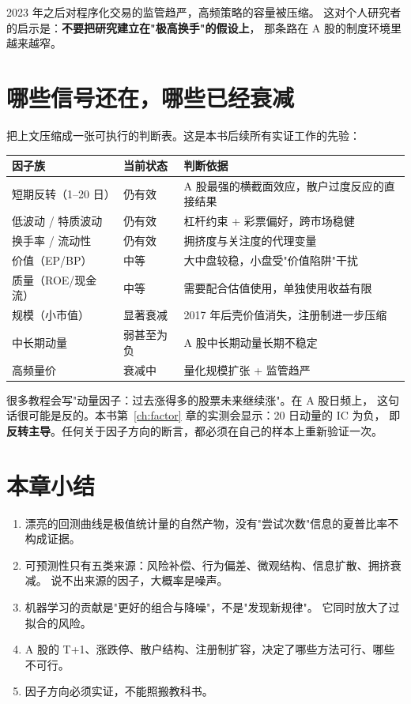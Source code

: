 2023 年之后对程序化交易的监管趋严，高频策略的容量被压缩。
这对个人研究者的启示是：\textbf{不要把研究建立在"极高换手"的假设上}，
那条路在 A 股的制度环境里越来越窄。

\section{哪些信号还在，哪些已经衰减}

把上文压缩成一张可执行的判断表。这是本书后续所有实证工作的先验：

\begin{center}
\begin{longtable}{@{}p{}p{}p{}@{}}
\toprule
\textbf{因子族} & \textbf{当前状态} & \textbf{判断依据} \\
\midrule
\endhead
短期反转（1--20 日） & 仍有效 & A 股最强的横截面效应，散户过度反应的直接结果 \\
低波动 / 特质波动 & 仍有效 & 杠杆约束 + 彩票偏好，跨市场稳健 \\
换手率 / 流动性 & 仍有效 & 拥挤度与关注度的代理变量 \\
价值（EP/BP） & 中等 & 大中盘较稳，小盘受"价值陷阱"干扰 \\
质量（ROE/现金流） & 中等 & 需要配合估值使用，单独使用收益有限 \\
规模（小市值） & 显著衰减 & 2017 年后壳价值消失，注册制进一步压缩 \\
中长期动量 & 弱甚至为负 & A 股中长期动量长期不稳定 \\
高频量价 & 衰减中 & 量化规模扩张 + 监管趋严 \\
\bottomrule
\end{longtable}
\end{center}

\begin{warnbox}
很多教程会写"动量因子：过去涨得多的股票未来继续涨"。在 A 股日频上，
这句话很可能是反的。本书第~\ref{ch:factor} 章的实测会显示：20 日动量的 IC 为负，
即\textbf{反转主导}。任何关于因子方向的断言，都必须在自己的样本上重新验证一次。
\end{warnbox}

\section{本章小结}

\begin{enumerate}
  \item 漂亮的回测曲线是极值统计量的自然产物，没有"尝试次数"信息的夏普比率不构成证据。
  \item 可预测性只有五类来源：风险补偿、行为偏差、微观结构、信息扩散、拥挤衰减。
        说不出来源的因子，大概率是噪声。
  \item 机器学习的贡献是"更好的组合与降噪"，不是"发现新规律"。
        它同时放大了过拟合的风险。
  \item A 股的 T+1、涨跌停、散户结构、注册制扩容，决定了哪些方法可行、哪些不可行。
  \item 因子方向必须实证，不能照搬教科书。
\end{enumerate}
